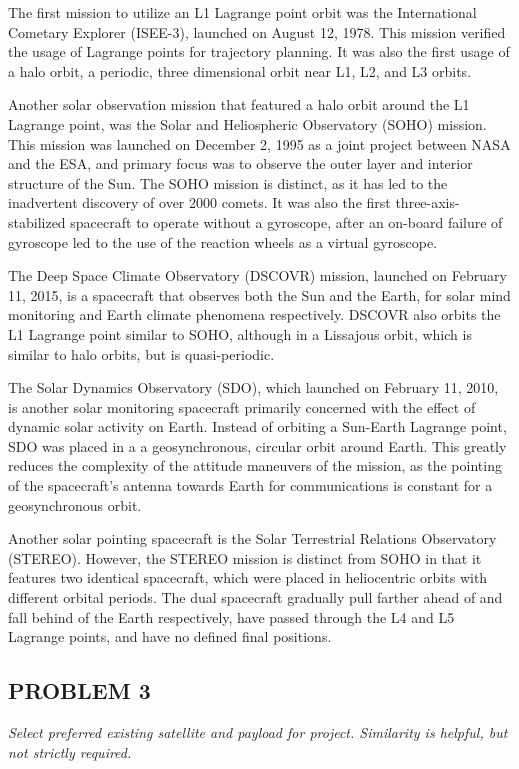 \documentclass[12pt,a4paper,notitlepage]{article}
\begin{document}
The first mission to utilize an L1 Lagrange point orbit was the International Cometary Explorer (ISEE-3), launched on August 12, 1978. This mission verified the usage of Lagrange points for trajectory planning. It was also the first usage of a halo orbit, a periodic, three dimensional orbit near L1, L2, and L3 orbits.

Another solar observation mission that featured a halo orbit around the L1 Lagrange point, was the Solar and Heliospheric Observatory (SOHO) mission. This mission was launched on December 2, 1995 as a joint project between NASA and the ESA, and primary focus was to observe the outer layer and interior structure of the Sun. The SOHO mission is distinct, as it has led to the inadvertent discovery of over 2000 comets. It was also the first three-axis-stabilized spacecraft to operate without a gyroscope, after an on-board failure of gyroscope led to the use of the reaction wheels as a virtual gyroscope.

The Deep Space Climate Observatory (DSCOVR) mission, launched on February 11, 2015, is a spacecraft that observes both the Sun and the Earth, for solar mind monitoring and Earth climate phenomena respectively. DSCOVR also orbits the L1 Lagrange point similar to SOHO, although in a Lissajous orbit, which is similar to halo orbits, but is quasi-periodic.

The Solar Dynamics Observatory (SDO), which launched on February 11, 2010, is another solar monitoring spacecraft primarily concerned with the effect of dynamic solar activity on Earth. Instead of orbiting a Sun-Earth Lagrange point, SDO was placed in a a geosynchronous, circular orbit around Earth. This greatly reduces the complexity of the attitude maneuvers of the mission, as the pointing of the spacecraft's antenna towards Earth for communications is constant for a geosynchronous orbit.

Another solar pointing spacecraft is the Solar Terrestrial Relations Observatory (STEREO). However, the STEREO mission is distinct from SOHO in that it features two identical spacecraft, which were placed in heliocentric orbits with different orbital periods. The dual spacecraft gradually pull farther ahead of and fall behind of the Earth respectively, have passed through the L4 and L5 Lagrange points, and have no defined final positions.

\subsection{PROBLEM 3}
\textit{Select preferred existing satellite and payload for project. Similarity is helpful, but not strictly required.}
\end{document}
